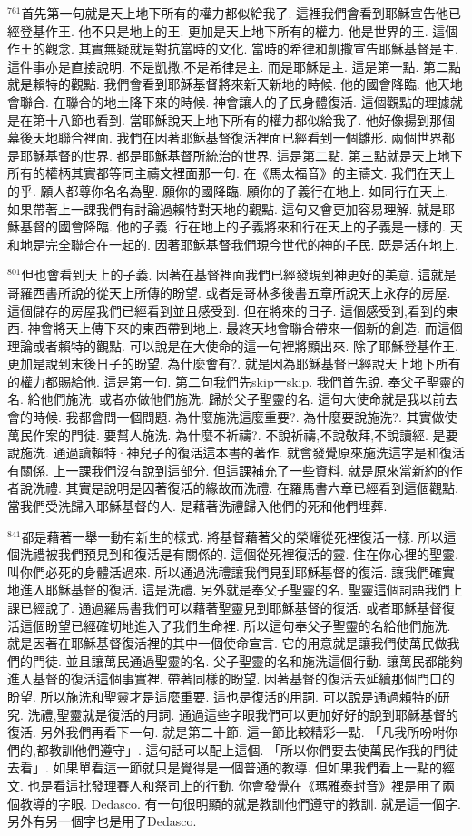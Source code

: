 \documentclass{book}
\begin{document}
$^{761}$首先第一句就是天上地下所有的權力都似給我了.
這裡我們會看到耶穌宣告他已經登基作王.
他不只是地上的王.
更加是天上地下所有的權力.
他是世界的王.
這個作王的觀念.
其實無疑就是對抗當時的文化.
當時的希律和凱撒宣告耶穌基督是主.
這件事亦是直接說明.
不是凱撒,不是希律是主.
而是耶穌是主.
這是第一點.
第二點就是賴特的觀點.
我們會看到耶穌基督將來新天新地的時候.
他的國會降臨.
他天地會聯合.
在聯合的地土降下來的時候.
神會讓人的子民身體復活.
這個觀點的理據就是在第十八節也看到.
當耶穌說天上地下所有的權力都似給我了.
他好像揚到那個幕後天地聯合裡面.
我們在因著耶穌基督復活裡面已經看到一個雛形.
兩個世界都是耶穌基督的世界.
都是耶穌基督所統治的世界.
這是第二點.
第三點就是天上地下所有的權柄其實都等同主禱文裡面那一句.
在《馬太福音》的主禱文.
我們在天上的乎.
願人都尊你名名為聖.
願你的國降臨.
願你的子義行在地上.
如同行在天上.
如果帶著上一課我們有討論過賴特對天地的觀點.
這句又會更加容易理解.
就是耶穌基督的國會降臨.
他的子義.
行在地上的子義將來和行在天上的子義是一樣的.
天和地是完全聯合在一起的.
因著耶穌基督我們現今世代的神的子民.
既是活在地上.

$^{801}$但也會看到天上的子義.
因著在基督裡面我們已經發現到神更好的美意.
這就是哥羅西書所說的從天上所傳的盼望.
或者是哥林多後書五章所說天上永存的房屋.
這個儲存的房屋我們已經看到並且感受到.
但在將來的日子.
這個感受到,看到的東西.
神會將天上傳下來的東西帶到地上.
最終天地會聯合帶來一個新的創造.
而這個理論或者賴特的觀點.
可以說是在大使命的這一句裡將顯出來.
除了耶穌登基作王.
更加是說到末後日子的盼望.
為什麼會有?.
就是因為耶穌基督已經說天上地下所有的權力都賜給他.
這是第一句.
第二句我們先skip一skip.
我們首先說.
奉父子聖靈的名.
給他們施洗.
或者亦做他們施洗.
歸於父子聖靈的名.
這句大使命就是我以前去會的時候.
我都會問一個問題.
為什麼施洗這麼重要?.
為什麼要說施洗?.
其實做使萬民作案的門徒.
要幫人施洗.
為什麼不祈禱?.
不說祈禱,不說敬拜,不說讀經.
是要說施洗.
通過讀賴特·神兒子的復活這本書的著作.
就會發覺原來施洗這字是和復活有關係.
上一課我們沒有說到這部分.
但這課補充了一些資料.
就是原來當新約的作者說洗禮.
其實是說明是因著復活的緣故而洗禮.
在羅馬書六章已經看到這個觀點.
當我們受洗歸入耶穌基督的人.
是藉著洗禮歸入他們的死和他們埋葬.

$^{841}$都是藉著一舉一動有新生的樣式.
將基督藉著父的榮耀從死裡復活一樣.
所以這個洗禮被我們預見到和復活是有關係的.
這個從死裡復活的靈.
住在你心裡的聖靈.
叫你們必死的身體活過來.
所以通過洗禮讓我們見到耶穌基督的復活.
讓我們確實地進入耶穌基督的復活.
這是洗禮.
另外就是奉父子聖靈的名.
聖靈這個詞語我們上課已經說了.
通過羅馬書我們可以藉著聖靈見到耶穌基督的復活.
或者耶穌基督復活這個盼望已經確切地進入了我們生命裡.
所以這句奉父子聖靈的名給他們施洗.
就是因著在耶穌基督復活裡的其中一個使命宣言.
它的用意就是讓我們使萬民做我們的門徒.
並且讓萬民通過聖靈的名.
父子聖靈的名和施洗這個行動.
讓萬民都能夠進入基督的復活這個事實裡.
帶著同樣的盼望.
因著基督的復活去延續那個門口的盼望.
所以施洗和聖靈才是這麼重要.
這也是復活的用詞.
可以說是通過賴特的研究.
洗禮,聖靈就是復活的用詞.
通過這些字眼我們可以更加好好的說到耶穌基督的復活.
另外我們再看下一句.
就是第二十節.
這一節比較精彩一點.
「凡我所吩咐你們的,都教訓他們遵守」.
這句話可以配上這個.
「所以你們要去使萬民作我的門徒去看」.
如果單看這一節就只是覺得是一個普通的教導.
但如果我們看上一點的經文.
也是看這批發理賽人和祭司上的行動.
你會發覺在《瑪雅泰封音》裡是用了兩個教導的字眼.
Dedasco.
有一句很明顯的就是教訓他們遵守的教訓.
就是這一個字.
另外有另一個字也是用了Dedasco.
\end{document}
